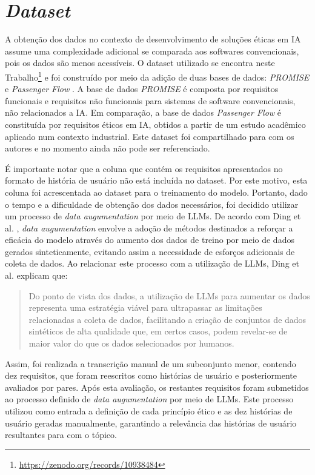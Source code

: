 \section{\emph{Dataset}}
A obtenção dos dados no contexto de desenvolvimento de soluções éticas em \acrshort{IA} assume uma complexidade adicional se comparada aos softwares convencionais, pois os dados são menos acessíveis. O dataset utilizado se encontra neste Trabalho\footnote{\url{https://zenodo.org/records/10938484}} e foi construído por meio da adição de duas bases de dados: \textit{PROMISE} \cite{CanedoM20} e \textit{Passenger Flow} \cite{pass}. A base de dados \textit{PROMISE} \cite{CanedoM20} é composta por requisitos funcionais e requisitos não funcionais para sistemas de software convencionais, não relacionados a \acrshort{IA}. Em comparação, a base de dados \textit{Passenger Flow} \cite{pass} é constituída por requisitos éticos em \acrshort{IA}, obtidos a partir de um estudo acadêmico aplicado num contexto industrial. Este dataset foi compartilhado para com os autores e no momento ainda não pode ser referenciado.

É importante notar que a coluna que contém os requisitos apresentados no formato de história de usuário não está incluída no dataset. Por este motivo, esta coluna foi acrescentada ao dataset para o treinamento do modelo. Portanto, dado o tempo e a dificuldade de obtenção dos dados necessários, foi decidido utilizar um processo de \textit{data augumentation} por meio de LLMs. De acordo com Ding et al. \cite{data-aug}, \textit{data augumentation} envolve a adoção de métodos destinados a  reforçar a eficácia do modelo através do aumento dos dados de treino por meio de dados gerados sinteticamente, evitando assim a necessidade de esforços adicionais de coleta de dados. Ao relacionar este processo com a utilização de LLMs, Ding et al. \cite{data-aug} explicam que:
\blockquote{Do ponto de vista dos dados, a utilização de LLMs para aumentar os dados representa uma estratégia viável para ultrapassar as limitações relacionadas a coleta de dados, facilitando a criação de conjuntos de dados sintéticos de alta qualidade que, em certos casos, podem revelar-se de maior valor do que os dados selecionados por humanos.}

Assim, foi realizada a transcrição manual de um subconjunto menor, contendo dez requisitos, que foram reescritos como histórias de usuário e posteriormente avaliados por pares. Após esta avaliação, os restantes requisitos foram submetidos ao processo definido de \textit{data augumentation} por meio de LLMs. Este processo utilizou como entrada a definição de cada princípio ético e as dez histórias de usuário geradas manualmente, garantindo a relevância das histórias de usuário resultantes para com o tópico.

